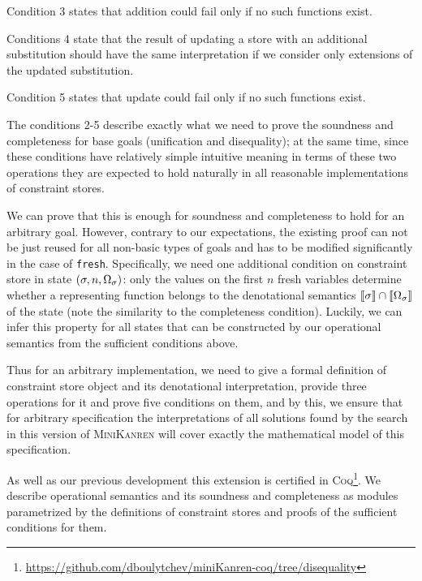 Condition 3 states that addition could fail only if no such functions exist.

Conditions 4 state that the result of updating a store with an additional substitution should have the same interpretation if we consider only extensions of the updated substitution.

Condition 5 states that update could fail only if no such functions exist.

The conditions 2-5 describe exactly what we need to prove the soundness and completeness for base goals (unification and disequality); at the same time,
since these conditions have relatively simple intuitive meaning in terms of these two operations they are expected to hold naturally
in all reasonable implementations of constraint stores.

We can prove that this is enough for soundness and completeness to hold for an arbitrary goal. However,
contrary to our expectations, the existing proof can not be just reused for all non-basic types of goals and has to be modified
significantly in the case of \lstinline|fresh|. Specifically, we need one additional condition on constraint store in state $(\sigma, n, \Omega_\sigma)$:
only the values on the first $n$ fresh variables determine whether a representing function belongs to the denotational semantics $\llbracket{\sigma}\rrbracket \cap \llbracket{\Omega_\sigma}\rrbracket$
of the state (note the similarity to the completeness condition). Luckily, we can infer this property for all states that can be constructed by our operational
semantics from the sufficient conditions above.

Thus for an arbitrary implementation, we need to give a formal definition of constraint store object and its denotational interpretation, provide three
operations for it and prove five conditions on them, and by this, we ensure that for arbitrary specification the interpretations of all solutions found by the
search in this version of \textsc{MiniKanren} will cover exactly the mathematical model of this specification.

As well as our previous development this extension is certified in \textsc{Coq}\footnote{\url{https://github.com/dboulytchev/miniKanren-coq/tree/disequality}}.
We describe operational semantics and its soundness and completeness as modules parametrized by the definitions of constraint
stores and proofs of the sufficient conditions for them.
